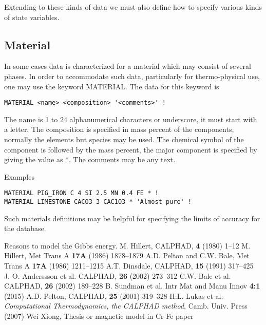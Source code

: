 \documentclass[12pt]{article}
\begin{document}
Extending to these kinds of data we must also define how to specify
various kinds of state variables.

\subsection{Material}\label{sec:material}

In some cases data is characterized for a material which may consist
of several phases.  In order to accommodate such data, particularly for
thermo-physical use, one may use the keyword MATERIAL.  The data for this
keyword is

\begin{verbatim}
MATERIAL <name> <composition> '<comments>' !
\end{verbatim}

The name is 1 to 24 alphanumerical characters or underscore, it must
start with a letter.  The composition is specified in mass percent of
the components, normally the elements but species may be used.  The
chemical symbol of the component is followed by the mass percent, the
major component is specified by giving the value as *.  The comments
may be any text.  

Examples

\begin{verbatim}
MATERIAL PIG_IRON C 4 SI 2.5 MN 0.4 FE * !
MATERIAL LIMESTONE CACO3 3 CAC1O3 * 'Almost pure' !
\end{verbatim}

Such materials definitions may be helpful for specifying the limits of
accuracy for the database.

\begin{thebibliography}{00Zzz}
 Reasons to model the Gibbs energy.
 M. Hillert, CALPHAD, {\bf 4} (1980) 1--12
 M. Hillert, Met Trans A {\bf 17A} (1986) 1878--1879
 A.D. Pelton and C.W. Bale, Met Trans A {\bf 17A}
  (1986) 1211--1215
 A.T. Dinsdale, CALPHAD, {\bf 15} (1991) 317--425 
 J.-O. Anderssson et al. CALPHAD, {\bf 26} (2002) 273--312
 C.W. Bale et al. CALPHAD, {\bf 26} (2002) 189--228
 B. Sundman et al. Intr Mat and Manu Innov {\bf 4:1} (2015)
 A.D. Pelton, CALPHAD, {\bf 25} (2001) 319--328
 H.L. Lukas et al. {\em Computational Thermodynamics,
  the CALPHAD method}, Camb. Univ. Press (2007)
 Wei Xiong, Thesis or magnetic model in Cr-Fe paper 
\end{thebibliography}
\end{document}
